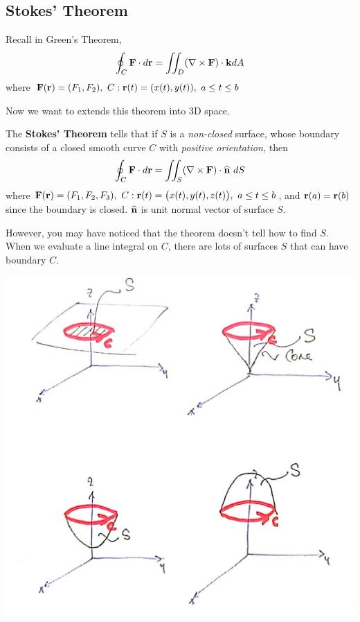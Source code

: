 \documentclass[11pt, a4paper]{MATH2023}
\newcommand{\kk}{{\bf k}}
\newcommand{\rr}{{\bf r}}
\newcommand{\FF}{{\bf F}}
\newcommand{\nm}{\widehat{\bf n}}
\begin{document}
\begin{spacing}{1.3}
    \newpage
    \section{Stokes’ Theorem}
    {\blue Recall in Green's Theorem, 
    $$\oint_C \FF\cdot d\rr =\iint_D (\nabla\times \FF)\cdot \kk dA$$
    where $\FF(\rr)=(F_1,F_2),\ C: \rr(t)=(x(t), y(t)),\ a\le t\le b$}

    Now we want to extends this theorem into 3D space.

    The {\bf Stokes' Theorem} tells that if $S$ is a {\it non-closed} surface, 
    whose boundary consists of a closed smooth curve $C$ with {\it positive orientation,} then
    $$\oint_C \FF\cdot d\rr =\iint_S (\nabla\times \FF)\cdot \nm \ dS$$
    where $\FF(\rr)=(F_1,F_2, F_3),\ C: \rr(t)=\bigl(x(t), y(t), z(t)\bigr),\ a\le t\le b$,
    and $\rr(a)=\rr(b)$ since the boundary is closed. $\nm$ is unit normal vector of surface $S$.

    \vspace{0.4in}
    However, you may have noticed that the theorem doesn't tell how to find $S$. When we evaluate a 
    line integral on $C$, there are lots of surfaces $S$ that can have boundary $C$. 
    \begin{center}
        \includegraphics[scale=0.24]{images/Ch16-stoke-manysurfaces.JPG}
    \end{center}


\end{spacing}
\end{document}

